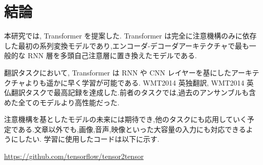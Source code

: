 \documentclass{jarticle}     %
\begin{document}
\section{結論}
本研究では, Transformer を提案した. Transformer は完全に注意機構のみに依存した最初の系列変換モデルであり,エンコーダ-デコーダアーキテクチャで最も一般的な RNN 層を多頭自己注意層に置き換えたモデルである.\par
翻訳タスクにおいて, Transformer は RNN や CNN レイヤーを基にしたアーキテクチャよりも遥かに早く学習が可能である. WMT2014 英独翻訳, WMT2014 英仏翻訳タスクで最高記録を達成した.前者のタスクでは,過去のアンサンブルも含めた全てのモデルより高性能だった.\par
注意機構を基としたモデルの未来には期待でき,他のタスクにも応用していく予定である.文章以外でも,画像,音声,映像といった大容量の入力にも対応できるようにしたい.
学習に使用したコードは以下に示す.\par
\url{https://github.com/tensorflow/tensor2tensor}




\end{document}
